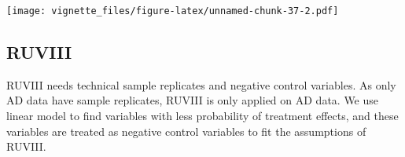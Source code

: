 \documentclass[]{book}
\newenvironment{Shaded}{\begin{snugshade}}{\end{snugshade}}
\newcommand{\KeywordTok}[1]{\textcolor[rgb]{0.13,0.29,0.53}{\textbf{#1}}}
\newcommand{\DecValTok}[1]{\textcolor[rgb]{0.00,0.00,0.81}{#1}}
\newcommand{\StringTok}[1]{\textcolor[rgb]{0.31,0.60,0.02}{#1}}
\newcommand{\CommentTok}[1]{\textcolor[rgb]{0.56,0.35,0.01}{\textit{#1}}}
\newcommand{\OtherTok}[1]{\textcolor[rgb]{0.56,0.35,0.01}{#1}}
\newcommand{\ControlFlowTok}[1]{\textcolor[rgb]{0.13,0.29,0.53}{\textbf{#1}}}
\newcommand{\OperatorTok}[1]{\textcolor[rgb]{0.81,0.36,0.00}{\textbf{#1}}}
\newcommand{\NormalTok}[1]{#1}
\begin{document}
\texttt{[image: vignette\_files/figure-latex/unnamed-chunk-37-2.pdf]}

\begin{Shaded}
\end{Shaded}

\subsection{RUVIII}\label{ruviii}

RUVIII needs technical sample replicates and negative control variables.
As only AD data have sample replicates, RUVIII is only applied on AD
data. We use linear model to find variables with less probability of
treatment effects, and these variables are treated as negative control
variables to fit the assumptions of RUVIII.
\end{document}
